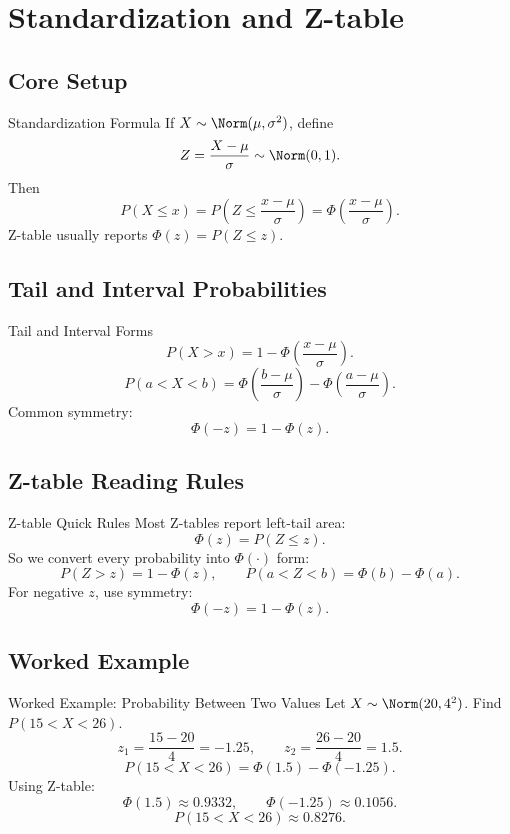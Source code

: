 \documentclass[aspectratio=169]{beamer}
\begin{document}
\section{Standardization and Z-table}

\subsection{Core Setup}
\begin{frame}{Standardization Formula}
  If \(X\sim\Norm(\mu,\sigma^2)\), define
  \[
    Z=\frac{X-\mu}{\sigma}\sim\Norm(0,1).
  \]
  Then
  \[
    P(X\le x)=P\!\left(Z\le \frac{x-\mu}{\sigma}\right)=\Phi\!\left(\frac{x-\mu}{\sigma}\right).
  \]
  \vspace{2mm}
  Z-table usually reports \(\Phi(z)=P(Z\le z)\).
\end{frame}

\subsection{Tail and Interval Probabilities}
\begin{frame}{Tail and Interval Forms}
  \[
    P(X>x)=1-\Phi\!\left(\frac{x-\mu}{\sigma}\right).
  \]
  \[
    P(a<X<b)=\Phi\!\left(\frac{b-\mu}{\sigma}\right)-\Phi\!\left(\frac{a-\mu}{\sigma}\right).
  \]
  \vspace{2mm}
  Common symmetry:
  \[
    \Phi(-z)=1-\Phi(z).
  \]
\end{frame}

\subsection{Z-table Reading Rules}
\begin{frame}{Z-table Quick Rules}
  Most Z-tables report left-tail area:
  \[
    \Phi(z)=P(Z\le z).
  \]
  So we convert every probability into \(\Phi(\cdot)\) form:
  \[
    P(Z>z)=1-\Phi(z),\qquad
    P(a<Z<b)=\Phi(b)-\Phi(a).
  \]
  For negative \(z\), use symmetry:
  \[
    \Phi(-z)=1-\Phi(z).
  \]
\end{frame}

\subsection{Worked Example}
\begin{frame}{Worked Example: Probability Between Two Values}
  Let \(X\sim\Norm(20,4^2)\). Find \(P(15<X<26)\).
  \[
    z_1=\frac{15-20}{4}=-1.25,\qquad z_2=\frac{26-20}{4}=1.5.
  \]
  \[
    P(15<X<26)=\Phi(1.5)-\Phi(-1.25).
  \]
  Using Z-table:
  \[
    \Phi(1.5)\approx0.9332,\qquad \Phi(-1.25)\approx0.1056.
  \]
  \[
    P(15<X<26)\approx0.8276.
  \]
\end{frame}
\end{document}
